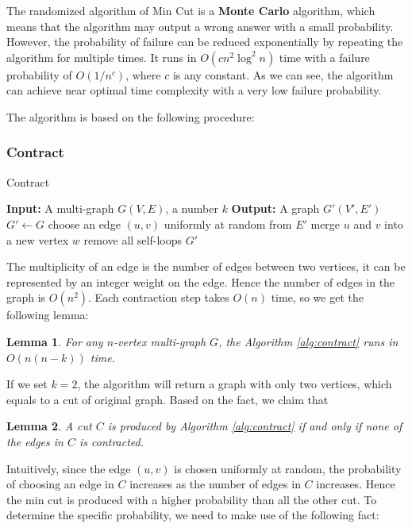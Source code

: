 \documentclass[11pt]{article}
\theoremstyle{plain}
\newtheorem{lemma}{Lemma}[section]
\begin{document}
The randomized algorithm of Min Cut is a \textbf{Monte Carlo} algorithm, which means that the algorithm may output a wrong answer with a small probability. However, the probability of failure can be reduced exponentially by repeating the algorithm for multiple times. It runs in $O(cn^2\log^2 n)$ time with a failure probability of $O(1/n^c)$, where $c$ is any constant. As we can see, the algorithm can achieve near optimal time complexity with a very low failure probability.

The algorithm is based on the following procedure:
\subsubsection{Contract}
\begin{algorithm}
\caption{Contract}
\label{alg:contract}
\begin{algorithmic}[1]
    \STATE \textbf{Input:} A multi-graph $G(V,E)$, a number $k$
    \STATE \textbf{Output:} A graph $G'(V',E')$
    \STATE $G'\leftarrow G$
    \STATE choose an edge $(u,v)$ uniformly at random from $E'$
    \STATE merge $u$ and $v$ into a new vertex $w$
    \STATE remove all self-loops
    \ENDWHILE
    \RETURN $G'$
\end{algorithmic}
\end{algorithm}
The multiplicity of an edge is the number of edges between two vertices, it can be represented by an integer weight on the edge. Hence the number of edges in the graph is $O(n^2)$. Each contraction step takes $O(n)$ time, so we get the following lemma:

\begin{lemma}
    \label{lemma:9}
    For any $n$-vertex multi-graph $G$, the Algorithm \ref{alg:contract} runs in $O(n(n-k))$ time.
\end{lemma}

If we set $k=2$, the algorithm will return a graph with only two vertices, which equals to a cut of original graph. Based on the fact, we claim that

\begin{lemma}
    \label{lemma:cut}
    A cut $C$ is produced by Algorithm \ref{alg:contract} if and only if none of the edges in $C$ is contracted.
\end{lemma}

Intuitively, since the edge $(u,v)$ is chosen uniformly at random, the probability of choosing an edge in $C$ increases as the number of edges in $C$ increases. Hence the min cut is produced with a higher probability than all the other cut. To determine the specific probability, we need to make use of the following fact:
\end{document}
